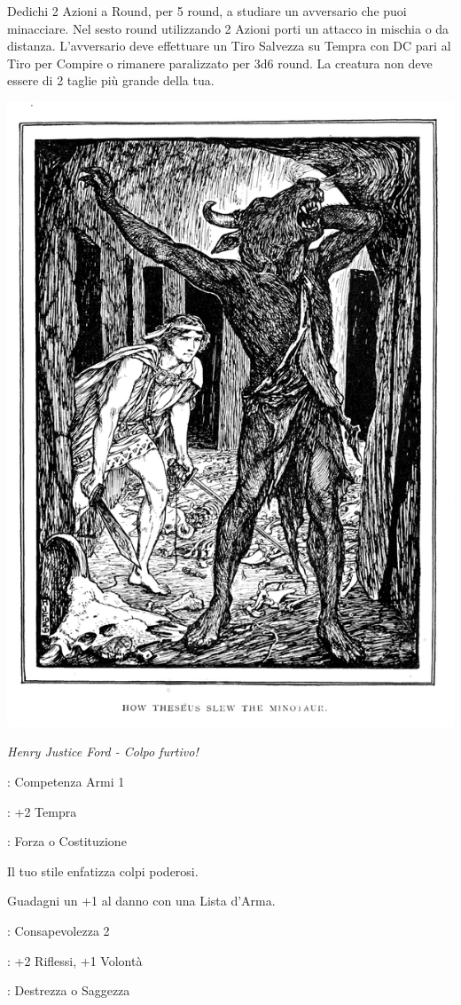\begin{multicols}{2}
Dedichi 2 Azioni a Round, per 5 round, a studiare un avversario che puoi minacciare. Nel sesto round utilizzando 2 Azioni porti un attacco in mischia o da distanza. L'avversario deve effettuare un Tiro Salvezza su Tempra con DC pari al Tiro per Compire o rimanere paralizzato per 3d6 round. La creatura non deve essere di 2 taglie più grande della tua.


\begin{center}
	\includegraphics[width=0.7\linewidth]{immagini/teseo.png}

	\emph{Henry Justice Ford - Colpo furtivo!}
\end{center}


\begin{description}[noitemsep, topsep=0pt, parsep=0pt, partopsep=0pt, leftmargin=0cm, labelwidth=2.5cm]
    \item[\textbf{Requisito}]: Competenza Armi 1
    \item[\textbf{Tiri Salvezza}]: +2 Tempra
    \item[\textbf{Caratteristica}]: Forza o Costituzione
\end{description}

Il tuo stile enfatizza colpi poderosi.

Guadagni un +1 al danno con una Lista d'Arma.


\begin{description}[noitemsep, topsep=0pt, parsep=0pt, partopsep=0pt, leftmargin=0cm, labelwidth=2.5cm]
    \item[\textbf{Requisito}]: Consapevolezza 2
    \item[\textbf{Tiri Salvezza}]: +2 Riflessi, +1 Volontà
    \item[\textbf{Caratteristica}]: Destrezza o Saggezza
\end{description}


\end{multicols}
